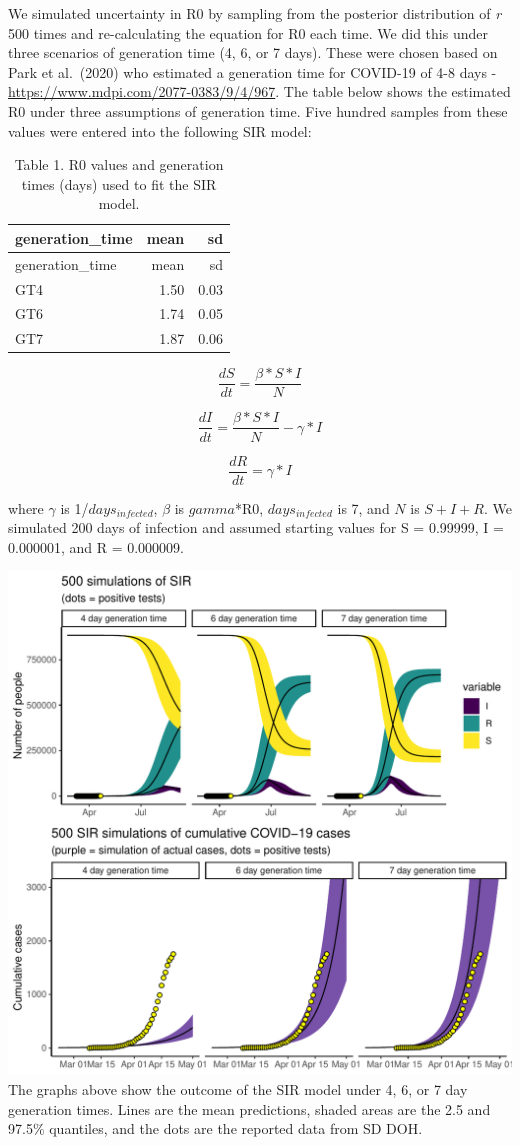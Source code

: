 \documentclass[
]{article}
\begin{document}
We simulated uncertainty in R0 by sampling from the posterior
distribution of \emph{r} 500 times and re-calculating the equation for
R0 each time. We did this under three scenarios of generation time (4,
6, or 7 days). These were chosen based on Park et al.~(2020) who
estimated a generation time for COVID-19 of 4-8 days -
\url{https://www.mdpi.com/2077-0383/9/4/967}. The table below shows the
estimated R0 under three assumptions of generation time. Five hundred
samples from these values were entered into the following SIR model:

\begin{longtable}[]{@{}lrr@{}}
\caption{Table 1. R0 values and generation times (days) used to fit the
SIR model.}\tabularnewline
\toprule
generation\_time & mean & sd\tabularnewline
\midrule
\endfirsthead
\toprule
generation\_time & mean & sd\tabularnewline
\midrule
\endhead
GT4 & 1.50 & 0.03\tabularnewline
GT6 & 1.74 & 0.05\tabularnewline
GT7 & 1.87 & 0.06\tabularnewline
\bottomrule
\end{longtable}

\[\frac{dS}{dt} = \frac{\beta*S*I}N\]

\[\frac{dI}{dt} = \frac{\beta*S*I}N - \gamma*I\]

\[\frac{dR}{dt} = \gamma*I\]

where \(\gamma\) is 1/\(days_{infected}\), \(\beta\) is \(gamma\)*R0,
\(days_{infected}\) is 7, and \(N\) is \(S+I+R\). We simulated 200 days
of infection and assumed starting values for S = 0.99999, I = 0.000001,
and R = 0.000009.

\includegraphics{script_SIR_sims_publish_files/figure-latex/unnamed-chunk-7-1.pdf}
The graphs above show the outcome of the SIR model under 4, 6, or 7 day
generation times. Lines are the mean predictions, shaded areas are the
2.5 and 97.5\% quantiles, and the dots are the reported data from SD
DOH.
\end{document}
